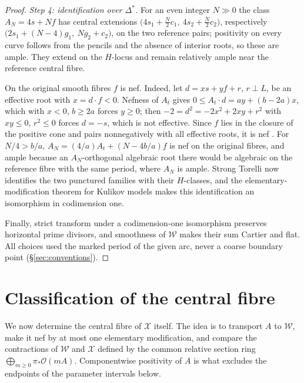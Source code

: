 \documentclass[11pt]{article}
\newcommand{\calX}{\mathcal X}
\newcommand{\calW}{\mathcal W}
\theoremstyle{definition}
\theoremstyle{remark}
\begin{document}
\begin{proof}
\emph{Step 4: identification over \(\Delta^*\).}
For an even integer \(N\gg0\) the class \(A_N=4s+Nf\) has central
extensions \(\bigl(4s_1+\tfrac N2c_1,\ 4s_2+\tfrac N2c_2\bigr)\),
respectively \(\bigl(2s_1+(N-4)g_1,\ Ng_2+c_2\bigr)\), on the two
reference pairs; positivity on every curve follows from the pencils
and the absence of interior roots, so these are ample. They extend on
the \(H\)-locus and remain relatively ample near the reference central
fibre.

On the original smooth fibres \(f\) is nef. Indeed, let
\(d=xs+yf+r\), \(r\perp L\), be an effective root with
\(x=d\cdot f<0\). Nefness of \(A_t\) gives
\(0\leq A_t\cdot d=ay+(b-2a)x\), which with \(x<0\), \(b\geq2a\)
forces \(y\geq0\); then \(-2=d^2=-2x^2+2xy+r^2\) with \(xy\leq0\),
\(r^2\leq0\) forces \(d=-s\), which is not effective. Since \(f\) lies
in the closure of the positive cone and pairs nonnegatively with all
effective roots, it is nef \cite[Ch.~8]{Hu}. For \(N/4>b/a\),
\(A_N=(4/a)A_t+(N-4b/a)f\) is nef on the original fibres, and ample
because an \(A_N\)-orthogonal algebraic root there would be algebraic
on the reference fibre with the same period, where \(A_N\) is ample.
Strong Torelli \cite[Theorem~2.3]{AE} now identifies the two punctured
families with their \(H\)-classes, and the elementary-modification
theorem for Kulikov models \cite[Corollary~3.1]{SB} makes this
identification an isomorphism in codimension one.

Finally, strict transform under a codimension-one isomorphism
preserves horizontal prime divisors, and smoothness of \(\calW\) makes
their sum Cartier and flat. All choices used the marked period of the
given arc, never a coarse boundary point (\S\ref{sec:conventions}).
\end{proof}

\section{Classification of the central fibre}\label{sec:models}


We now determine the central fibre of \(\calX\) itself. The idea is to
transport \(A\) to \(\calW\), make it nef by at most one elementary
modification, and compare the contractions of \(\calW\) and \(\calX\)
defined by the common relative section ring
\(\bigoplus_{m\ge0}\pi_*\mathcal O(mA)\). Componentwise positivity
of \(A\) is what excludes the endpoints of the parameter intervals
below.
\end{document}
